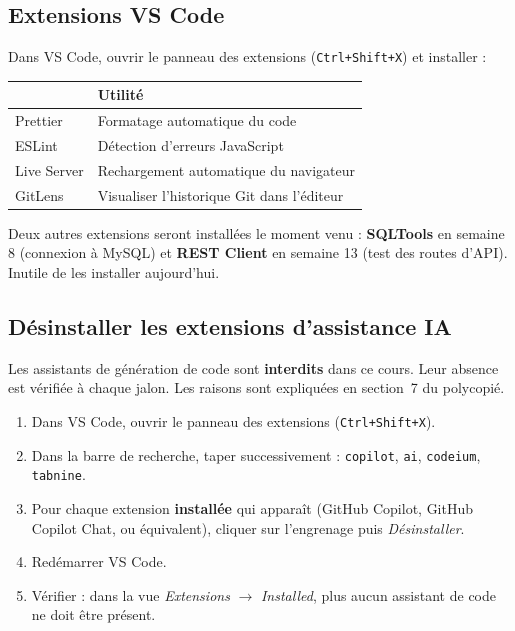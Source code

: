 \documentclass[a4paper,11pt]{article}
\newcommand{\hdr}[1]{\multicolumn{1}{l}{\color{white}\bfseries #1}}
\renewcommand{\arraystretch}{1.3}
\begin{document}
\subsection{Extensions VS Code}

Dans VS Code, ouvrir le panneau des extensions (\texttt{Ctrl+Shift+X}) et installer :

\begin{center}
\renewcommand{\arraystretch}{1.0}
\begin{tabularx}{\linewidth}{p{3.6cm}X}
  \toprule
  \rowcolor{uniNavy}
  \hdr{Extension} &  \hdr{Utilité} \\
  \midrule
  \rowcolor{uniPaper}
  Prettier      & Formatage automatique du code \\
  ESLint        & Détection d'erreurs JavaScript \\
  \rowcolor{uniPaper}
  Live Server   & Rechargement automatique du navigateur \\
  GitLens       & Visualiser l'historique Git dans l'éditeur \\
  \bottomrule
\end{tabularx}
\end{center}

\begin{tcolorbox}[astuce, title={Plus tard dans l'année}]
Deux autres extensions seront installées le moment venu : \textbf{SQLTools} en semaine 8 (connexion à MySQL) et \textbf{REST Client} en semaine 13 (test des routes d'API). Inutile de les installer aujourd'hui.
\end{tcolorbox}

\subsection{Désinstaller les extensions d'assistance IA}

\begin{tcolorbox}[interdit, title={Étape obligatoire du cours}]
Les assistants de génération de code sont \textbf{interdits} dans ce cours. Leur absence est vérifiée à chaque jalon. Les raisons sont expliquées en section~7 du polycopié.
\end{tcolorbox}

\begin{enumerate}
  \item Dans VS Code, ouvrir le panneau des extensions (\texttt{Ctrl+Shift+X}).
  \item Dans la barre de recherche, taper successivement : \texttt{copilot}, \texttt{ai}, \texttt{codeium}, \texttt{tabnine}.
  \item Pour chaque extension \textbf{installée} qui apparaît (GitHub Copilot, GitHub Copilot Chat, ou équivalent), cliquer sur l'engrenage puis \textit{Désinstaller}.
  \item Redémarrer VS Code.
  \item Vérifier : dans la vue \textit{Extensions} $\rightarrow$ \textit{Installed}, plus aucun assistant de code ne doit être présent.
\end{enumerate}
\end{document}
